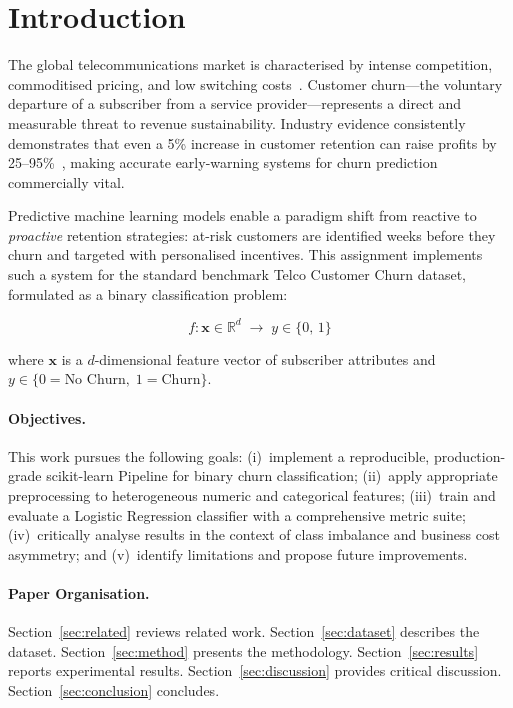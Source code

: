 \documentclass{llncs}
\begin{document}
\section{Introduction}
\label{sec:intro}

The global telecommunications market is characterised by intense
competition, commoditised pricing, and low switching costs~\cite{verbeke2012new}.
Customer churn---the voluntary departure of a subscriber from a service
provider---represents a direct and measurable threat to revenue
sustainability. Industry evidence consistently demonstrates that even a
5\% increase in customer retention can raise profits by
25--95\%~\cite{reichheld1990zero}, making accurate early-warning systems
for churn prediction commercially vital.

Predictive machine learning models enable a paradigm shift from reactive
to \emph{proactive} retention strategies: at-risk customers are
identified weeks before they churn and targeted with personalised
incentives. This assignment implements such a system for the standard
benchmark Telco Customer Churn dataset, formulated as a binary
classification problem:

\begin{equation}
  f : \mathbf{x} \in \mathbb{R}^{d} \;\longrightarrow\; y \in \{0,\,1\}
  \label{eq:problem}
\end{equation}

\noindent where $\mathbf{x}$ is a $d$-dimensional feature vector of
subscriber attributes and $y \in \{0 = \text{No Churn},\;
1 = \text{Churn}\}$.

\paragraph{Objectives.} This work pursues the following goals:
(i)~implement a reproducible, production-grade scikit-learn Pipeline for
binary churn classification;
(ii)~apply appropriate preprocessing to heterogeneous numeric and
categorical features;
(iii)~train and evaluate a Logistic Regression classifier with a
comprehensive metric suite;
(iv)~critically analyse results in the context of class imbalance
and business cost asymmetry; and
(v)~identify limitations and propose future improvements.

\paragraph{Paper Organisation.}
Section~\ref{sec:related} reviews related work.
Section~\ref{sec:dataset} describes the dataset.
Section~\ref{sec:method} presents the methodology.
Section~\ref{sec:results} reports experimental results.
Section~\ref{sec:discussion} provides critical discussion.
Section~\ref{sec:conclusion} concludes.
\end{document}
